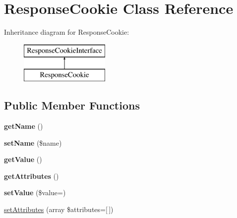\hypertarget{class_pes_1_1_http_1_1_cookies_1_1_response_cookie}{}\section{Response\+Cookie Class Reference}
\label{class_pes_1_1_http_1_1_cookies_1_1_response_cookie}
Inheritance diagram for Response\+Cookie\+:\begin{figure}[H]
\begin{center}
\leavevmode
\includegraphics[height=2.000000cm]{class_pes_1_1_http_1_1_cookies_1_1_response_cookie}
\end{center}
\end{figure}
\subsection*{Public Member Functions}
\begin{DoxyCompactItemize}
\item 
\mbox{\label{class_pes_1_1_http_1_1_cookies_1_1_response_cookie_a3d0963e68bb313b163a73f2803c64600}} 
{\bfseries get\+Name} ()
\item 
\mbox{\label{class_pes_1_1_http_1_1_cookies_1_1_response_cookie_a2fe666694997d047711d7653eca2f132}} 
{\bfseries set\+Name} (\$name)
\item 
\mbox{\label{class_pes_1_1_http_1_1_cookies_1_1_response_cookie_ac0bc18784b182c89fcfd276625aef435}} 
{\bfseries get\+Value} ()
\item 
\mbox{\label{class_pes_1_1_http_1_1_cookies_1_1_response_cookie_afbe85ec4b9947cc951c67d63911cf0a4}} 
{\bfseries get\+Attributes} ()
\item 
\mbox{\label{class_pes_1_1_http_1_1_cookies_1_1_response_cookie_a284ad325a01dfad382452db96d0cd5c0}} 
{\bfseries set\+Value} (\$value=\textquotesingle{}\textquotesingle{})
\item 
\mbox{\hyperlink{class_pes_1_1_http_1_1_cookies_1_1_response_cookie_a9510d3a1a07572eeb03d9ccd1c4290c2}{set\+Attributes}} (array \$attributes=\mbox{[}$\,$\mbox{]})
\end{DoxyCompactItemize}



